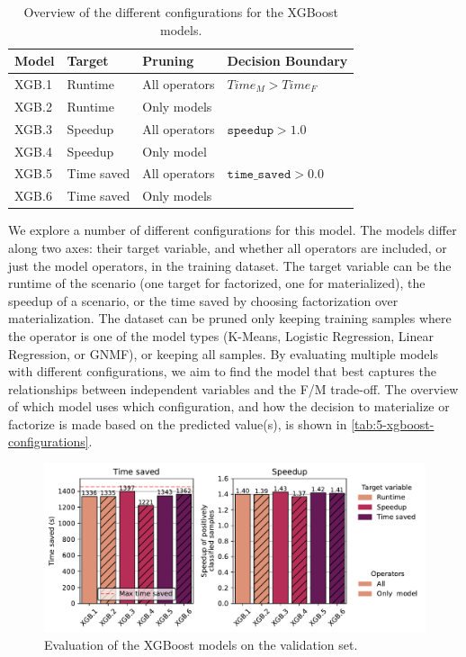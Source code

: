 \begin{table}[ht]
    \centering
    \begin{tabular}{llll}
        \toprule
        Model & Target     & Pruning       & Decision Boundary            \\
        \midrule \midrule
        XGB.1 & Runtime    & All operators & $Time_M > Time_F$            \\
        XGB.2 & Runtime    & Only models   &                              \\
        XGB.3 & Speedup    & All operators & $\texttt{speedup} > 1.0$     \\
        XGB.4 & Speedup    & Only model    &                              \\
        XGB.5 & Time saved & All operators & $\texttt{time\_saved} > 0.0$ \\
        XGB.6 & Time saved & Only models   &                              \\
        \bottomrule
    \end{tabular}
    \caption[XGBoost configurations]{Overview of the different configurations for the XGBoost models.}
    \label{tab:5-xgboost-configurations}
\end{table}

We explore a number of different configurations for this model. The models differ along two axes: their target variable, and whether all operators are included, or just the model operators, in the training dataset. The target variable can be the runtime of the scenario (one target for factorized, one for materialized), the speedup of a scenario, or the time saved by choosing factorization over materialization. The dataset can be pruned only keeping training samples where the operator is one of the model types (K-Means, Logistic Regression, Linear Regression, or GNMF), or keeping all samples. By evaluating multiple models with different configurations, we aim to find the model that best captures the relationships between independent variables and the F/M trade-off. The overview of which model uses which configuration, and how the decision to materialize or factorize is made based on the predicted value(s), is shown in \autoref{tab:5-xgboost-configurations}.

\begin{figure}[ht]
    \centering
    \includegraphics[width=\linewidth]{chapters/05_cost_estimation/figures/xgb-models-compare.pdf}
    \caption[XGBoost Estimator Comparison]{Evaluation of the XGBoost models on the validation set.}
    \label{fig:5-xgboost-evaluation}
\end{figure}

